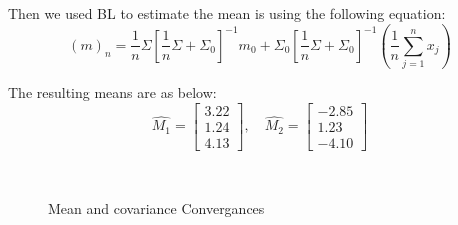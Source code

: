 \documentclass[11pt, oneside]{article}   	%
\begin{document}
Then we used BL to estimate the mean is using the following equation:
$$\left(m\right)_n=\frac{1}{n}\Sigma\left[\frac{1}{n}\Sigma+\Sigma_0\right]^{-1}m_0+\Sigma_0\left[\frac{1}{n}\Sigma+\Sigma_0\right]^{-1}\left(\frac{1}{n}\sum_{j=1}^{n}x_j\right)$$

The resulting means are as below:
$$\hat{M_1} = \begin{bmatrix}
3.22 \\ 1.24 \\ 4.13 
\end{bmatrix},\quad \hat{M_2} = \begin{bmatrix}
-2.85 \\ 1.23 \\ -4.10 
\end{bmatrix}$$

\begin{figure}
\begin{center}
	\\
\end{center}
\caption{Mean and covariance Convergances}
\end{figure}
\end{document}

